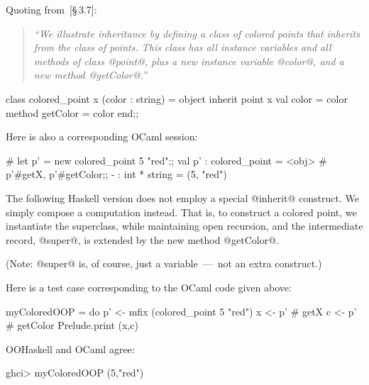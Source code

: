 \documentclass{jfp}
\begin{document}
Quoting from~\cite{OCaml}[\S\,3.7]:

\begin{quote}\itshape\small
``We illustrate inheritance by defining a class of colored points that
inherits from the class of points. This class has all instance
variables and all methods of class @point@, plus a new instance
variable @color@, and a new method @getColor@.''
\end{quote}

\begin{code}
 class colored_point x (color : string) =
   object
     inherit point x
     val color = color
     method getColor = color
   end;;
\end{code}

Here is also a corresponding OCaml session:

\begin{code}
 # let p' = new colored_point 5 "red";;
 val p' : colored_point = <obj>
 # p'#getX, p'#getColor;;
 - : int * string = (5, "red")
\end{code}

The following Haskell version does not employ a special @inherit@
construct. We simply compose a computation instead. That is, to
construct a colored point, we instantiate the superclass, while
maintaining open recursion, and the intermediate record, @super@,
is extended by the new method @getColor@.


(Note: @super@ is, of course, just a variable~---~not an extra construct.)

Here is a test case corresponding to the OCaml code given above:

\begin{code}
 myColoredOOP =
   do
      p' <- mfix (colored_point 5 "red")
      x  <- p' # getX
      c  <- p' # getColor
      Prelude.print (x,c)
\end{code}

OOHaskell and OCaml agree:

\begin{code}
 ghci>  myColoredOOP
 (5,"red")
\end{code}



\end{document}
